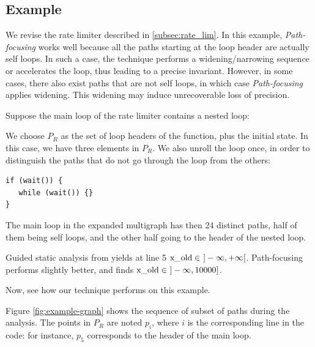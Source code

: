 \documentclass[preprint]{sigplanconf}
\begin{document}
\subsection{Example}

We revise the rate limiter described in \ref{subsec:rate_lim}. In this example,
\emph{Path-focusing} works well because all the paths starting at the
loop header are actually self loops. In such a case, the technique performs a
widening/narrowing sequence or accelerates the loop, thus leading to a precise
invariant. However, in some cases, there also exist paths that are not
self loops, in which case \emph{Path-focusing} applies widening. 
This widening may induce unrecoverable loss of precision.

Suppose the main loop of the rate limiter contains a nested loop:


We choose $P_R$ as the set of loop headers of the function, plus the initial
state. In this case, we have three elements in $P_R$.
We also unroll the loop once, in order to distinguish the paths that do not go
through the loop from the others:
\begin{lstlisting}[numbers=none]
if (wait()) {
   while (wait()) {}
}
\end{lstlisting}

The main loop in the expanded multigraph has then 24 distinct paths, half of
them being self loops, and the other half going to the header of the nested loop.

Guided static analysis from \citet{DBLP:conf/sas/GopanR07} yields at line 5
$\lstinline|x_old| \in~]-\infty,+\infty[$.
Path-focusing \citep{Monniaux_Gonnord_SAS11} performs slightly
better, and finds $\lstinline|x_old| \in~]-\infty,10000]$.

Now, see how our technique performs on this example.

Figure \ref{fig:example-graph} shows the sequence of subset of paths during the
analysis. The points in $P_R$ are noted $p_i$, where $i$ is the corresponding
line in the code: for instance, $p_5$ corresponds to the header of the main
loop.
\end{document}
